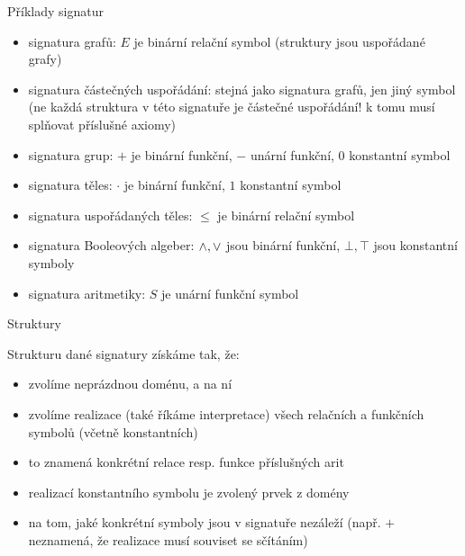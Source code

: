 \documentclass{beamer}
\begin{document}
\begin{frame}{Příklady signatur}

    \begin{itemize}
        \item {} signatura \alert{grafů}: $E$ je binární relační symbol (struktury jsou uspořádané grafy)
        \item \myexampleinline{
        $\langle \leq \rangle$
        } signatura \alert{částečných uspořádání}: stejná jako signatura grafů, jen jiný symbol (ne každá struktura v této signatuře je částečné uspořádání! k tomu musí splňovat příslušné \alert{axiomy})
        \item \myexampleinline{
        $\langle +, -, 0\rangle$
        } signatura \alert{grup}: $+$ je binární funkční, $-$ unární funkční, $0$ konstantní symbol
        \item {} signatura \alert{těles}: $\cdot$ je binární funkční, $1$ konstantní symbol
        \item {} signatura \alert{uspořádaných těles}: $\leq$ je binární relační symbol
        \item \myexampleinline{
        $\langle -,\landsymb,\lorsymb,\bot,\top\rangle$
        } signatura \alert{Booleových algeber}: ${\land},{\lor}$ jsou binární funkční, $\bot,\top$ jsou konstantní symboly
        \item {} signatura \alert{aritmetiky}: $S$ je unární funkční symbol
    \end{itemize}
    
\end{frame}


\begin{frame}{Struktury}

    \alert{Strukturu} dané signatury získáme tak, že:
    \begin{itemize}
        \item zvolíme neprázdnou \alert{doménu}, a na ní
        \item zvolíme \alert{realizace} (také říkáme \alert{interpretace}) všech relačních a funkčních symbolů (včetně konstantních)
        \item to znamená \alert{konkrétní} relace resp. funkce příslušných arit
        \item realizací konstantního symbolu je zvolený prvek z domény
        \item na tom, jaké konkrétní symboly jsou v signatuře nezáleží (např. $+$ neznamená, že realizace musí souviset se sčítáním)
    \end{itemize}

\end{frame}
\end{document}
